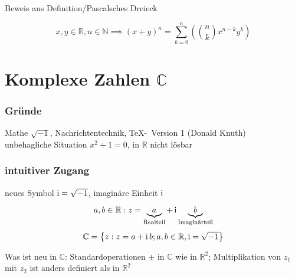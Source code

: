 \noindent Beweis aus Definition/Pascalsches Dreieck

\begin{proposition}
 \[ x,y \in \mathbb{R}, n \in \mathbb{N} \implies (x+y)^n =  \sum_{k=0}^n \left( {n \choose k} x^{n-k}y^k \right) \]
\end{proposition}

\section{Komplexe Zahlen $\mathbb{C}$}

\subsubsection*{Gründe}

Mathe $\sqrt{-1}$, Nachrichtentechnik, \TeX-\MF\  Version 1 (Donald Knuth)\\
unbehagliche Situation $x^2+1=0$, in $\mathbb{R}$ nicht lösbar

\subsubsection*{intuitiver Zugang}

neues Symbol $\operatorname{i} = \sqrt{-1}$, imaginäre Einheit $\operatorname{i}$

\begin{definition}
  \begin{equation*} a, b \in \mathbb{R}: z = \underbrace{a}_\text{Realteil} + \operatorname{i} \underbrace{b}_\text{Imaginärteil} \end{equation*}
  \begin{equation*} \mathbb{C} = \left\{ z : z = a+\operatorname{i} b; a,b \in \mathbb{R}, \operatorname{i} = \sqrt{-1} \right\} \end{equation*}
\end{definition}
%
\noindent Was ist neu in $\mathbb{C}$: Standardoperationen $\pm$ in $\mathbb{C}$ wie in $\mathbb{R}^2$; Multiplikation von $z_1$ mit $z_2$ ist anders definiert als in $\mathbb{R}^2$